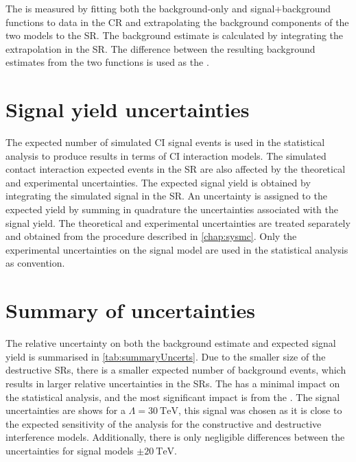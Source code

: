 The \CRBU is measured by fitting both the background-only and signal+background functions to data in the CR and extrapolating the background components of the two models to the SR. The background estimate is calculated by integrating the extrapolation in the SR. The difference between the resulting background estimates from the two functions is used as the \CRBU. 

\section{Signal yield uncertainties}\label{sec:uncertBkgmodel:signalyield}
The expected number of simulated CI signal events is used in the statistical analysis to produce results in terms of CI interaction models. The simulated contact interaction expected events in the SR are also affected by the theoretical and experimental uncertainties. The expected signal yield is obtained by integrating the simulated signal in the SR. An uncertainty is assigned to the expected yield by summing in quadrature the uncertainties associated with the signal yield. The theoretical and experimental uncertainties are treated separately and obtained from the procedure described in \cref{chap:sysmc}. Only the experimental uncertainties on the signal model are used in the statistical analysis as convention. 

\section{Summary of uncertainties}\label{sec:uncertBkgmodel:summary}

The relative uncertainty on both the background estimate and expected signal yield is summarised in \cref{tab:summaryUncerts}. Due to the smaller size of the destructive SRs, there is a smaller expected number of background events, which results in larger relative uncertainties in the SRs. The \CRBU has a minimal impact on the statistical analysis, and the most significant impact is from the \STATU. The signal uncertainties are shows for a $\Lambda = \SI{30}{\tera\electronvolt}$, this signal was chosen as it is close to the expected sensitivity of the analysis for the constructive and destructive interference models. Additionally, there is only negligible differences between the uncertainties for signal models $\pm \SI{20}{\tera\electronvolt}$.

